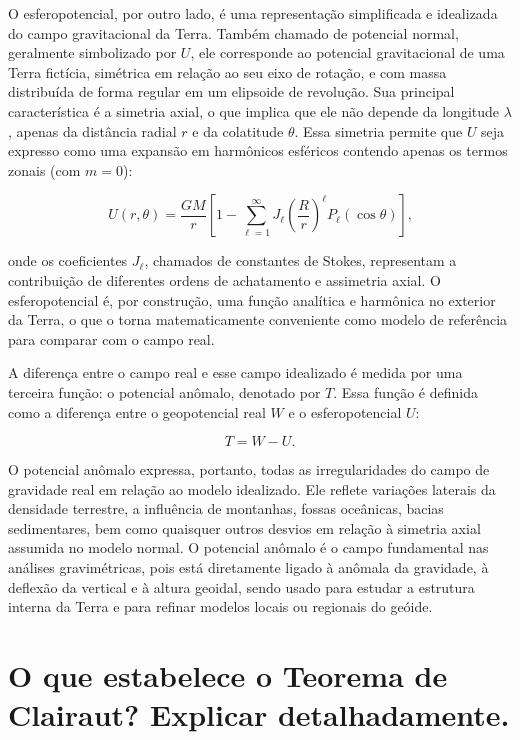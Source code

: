 O esferopotencial, por outro lado, é uma representação simplificada e idealizada do campo gravitacional da Terra. Também chamado de potencial normal, geralmente simbolizado por \( U \), ele corresponde ao potencial gravitacional de uma Terra fictícia, simétrica em relação ao seu eixo de rotação, e com massa distribuída de forma regular em um elipsoide de revolução. Sua principal característica é a simetria axial, o que implica que ele não depende da longitude \( \lambda \), apenas da distância radial \( r \) e da colatitude \( \theta \). Essa simetria permite que \( U \) seja expresso como uma expansão em harmônicos esféricos contendo apenas os termos zonais (com \( m = 0 \)):

\[
U(r, \theta) = \frac{GM}{r} \left[1 - \sum_{\ell=1}^\infty J_\ell \left( \frac{R}{r} \right)^\ell P_\ell(\cos \theta) \right] \text{,}
\]

\noindent
onde os coeficientes \( J_\ell \), chamados de constantes de Stokes, representam a contribuição de diferentes ordens de achatamento e assimetria axial. O esferopotencial é, por construção, uma função analítica e harmônica no exterior da Terra, o que o torna matematicamente conveniente como modelo de referência para comparar com o campo real.

A diferença entre o campo real e esse campo idealizado é medida por uma terceira função: o potencial anômalo, denotado por \( T \). Essa função é definida como a diferença entre o geopotencial real \( W \) e o esferopotencial \( U \):

\[
T = W - U \text{.}
\]

\noindent
O potencial anômalo expressa, portanto, todas as irregularidades do campo de gravidade real em relação ao modelo idealizado. Ele reflete variações laterais da densidade terrestre, a influência de montanhas, fossas oceânicas, bacias sedimentares, bem como quaisquer outros desvios em relação à simetria axial assumida no modelo normal. O potencial anômalo é o campo fundamental nas análises gravimétricas, pois está diretamente ligado à anômala da gravidade, à deflexão da vertical e à altura geoidal, sendo usado para estudar a estrutura interna da Terra e para refinar modelos locais ou regionais do geóide.


\section{O que estabelece o Teorema de Clairaut? Explicar detalhadamente.}

